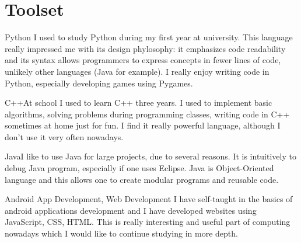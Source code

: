 \documentclass{tccv}
\begin{document}
\section{Toolset}

\begin{skillist}

\item{Python}
     {I used to study Python during my first year at university. This language really impressed me with its design phylosophy: it emphasizes code readability and its syntax allows programmers to express concepts in fewer lines of code, unlikely other languages (Java for example). I really enjoy writing code in Python, especially developing games using Pygames.}

\item{C++}{At school I used to learn C++ three years. I used to implement basic algorithms, solving problems during programming classes, writing code in C++ sometimes at home just for fun. I find it really powerful language, although I don't use it very often nowadays. }

\item{Java}{I like to use Java for large projects, due to several reasons. It is intuitively to debug Java program, especially if one uses Eclipse. Java is Object-Oriented language and this allows one to create modular programs and reusable code.}

\item{Android App Development, Web Development}{ I have self-taught in the basics of android applications development and I have developed websites using JavaScript, CSS, HTML. This is really interesting and useful part of computing nowadays which I would like to continue studying in more depth.}
\end{skillist}
\end{document}
